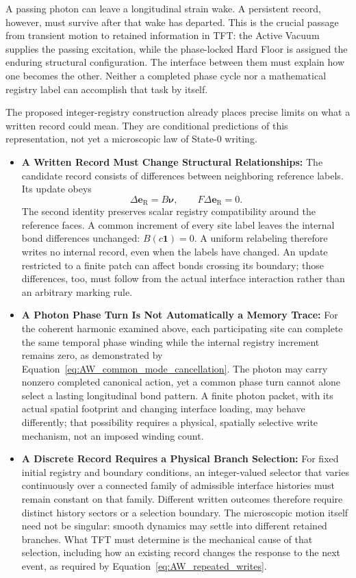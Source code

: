 A passing photon can leave a longitudinal strain wake. A persistent record,
however, must survive after that wake has departed. This is the crucial
passage from transient motion to retained information in TFT: the Active
Vacuum supplies the passing excitation, while the phase-locked Hard Floor
is assigned the enduring structural configuration. The interface between
them must explain how one becomes the other. Neither a completed phase
cycle nor a mathematical registry label can accomplish that task by itself.

The proposed integer-registry construction already places precise limits
on what a written record could mean. They are conditional predictions of
this representation, not yet a microscopic law of State-0 writing.

\begin{itemize}

\item \textbf{A Written Record Must Change Structural Relationships:}
The candidate record consists of differences between neighboring reference
labels. Its update obeys
\begin{equation*}
\Delta\mathbf e_{\mathrm R}=B\boldsymbol\nu,
\qquad F\Delta\mathbf e_{\mathrm R}=0.
\end{equation*}
The second identity preserves scalar registry compatibility around the
reference faces. A common increment of every site label leaves the
internal bond differences unchanged: $B(c\mathbf 1)=0$. A uniform
relabeling therefore writes no internal record, even when the labels
have changed. An update restricted to a finite patch can affect bonds
crossing its boundary; those differences, too, must follow from the
actual interface interaction rather than an arbitrary marking rule.

\item \textbf{A Photon Phase Turn Is Not Automatically a Memory Trace:}
For the coherent harmonic examined above, each participating site can
complete the same temporal phase winding while the internal registry
increment remains zero, as demonstrated by
Equation~\eqref{eq:AW_common_mode_cancellation}. The photon may carry
nonzero completed canonical action, yet a common phase turn cannot alone
select a lasting longitudinal bond pattern. A finite photon packet,
with its actual spatial footprint and changing interface loading,
may behave differently; that possibility requires a physical,
spatially selective write mechanism, not an imposed winding count.

\item \textbf{A Discrete Record Requires a Physical Branch Selection:}
For fixed initial registry and boundary conditions, an integer-valued
selector that varies continuously over a connected family of admissible
interface histories must remain constant on that family. Different
written outcomes therefore require distinct history sectors or a
selection boundary. The microscopic motion itself need not be singular:
smooth dynamics may settle into different retained branches. What TFT
must determine is the mechanical cause of that selection, including
how an existing record changes the response to the next event, as
required by Equation~\eqref{eq:AW_repeated_writes}.


\end{itemize}
